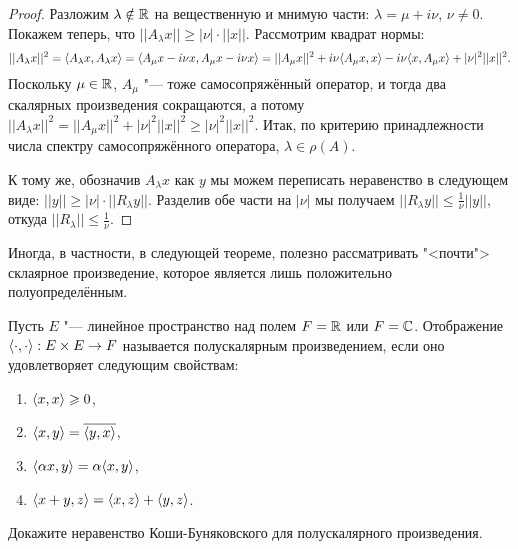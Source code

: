 \documentclass[main]{subfiles}
\begin{document}
\begin{proof}
  Разложим \( \lambda \notin \mathbb{R} \)
  на вещественную и мнимую части:
  \( \lambda = \mu + i \nu \),
  \( \nu \ne 0 \).
  Покажем теперь, что
  \( ||A_\lambda x|| \ge |\nu| \cdot ||x|| \).
  Рассмотрим квадрат нормы:
  \[
    ||A_\lambda x||^2 =
    \langle A_\lambda x, A_\lambda x \rangle =
    \langle A_\mu x - i \nu x, A_\mu x - i \nu x \rangle =
    ||A_\mu x||^2 + i \nu \langle A_\mu x, x \rangle
    - i \nu \langle x, A_\mu x \rangle + |\nu|^2 ||x||^2.
  \]
  Поскольку \( \mu \in \mathbb{R} \),
  \( A_\mu \) "--- тоже самосопряжённый оператор,
  и тогда два скалярных произведения сокращаются,
  а потому \( ||A_\lambda x||^2 = ||A_\mu x||^2 +
  |\nu|^2 ||x||^2 \ge |\nu|^2 ||x||^2 \).
  Итак, по критерию принадлежности числа спектру
  самосопряжённого оператора, \( \lambda \in \rho(A) \).

  К тому же, обозначив \( A_\lambda x \) как \( y \)
  мы можем переписать неравенство в следующем виде:
  \( ||y|| \ge |\nu| \cdot ||R_\lambda y|| \).
  Разделив обе части на \( |\nu| \) мы получаем
  \( ||R_\lambda y|| \le \frac1\nu ||y|| \),
  откуда \( ||R_\lambda|| \le \frac1\nu \).
\end{proof}

Иногда, в частности, в следующей теореме,
полезно рассматривать "<почти"> склаярное произведение,
которое является лишь положительно полуопределённым.

\begin{definition}
  Пусть \( E \) "--- линейное пространство
  над полем \( F = \mathbb{R} \) или \( F = \mathbb{C} \).
  Отображение
  \( \langle \cdot, \cdot \rangle : E \times E \to F \)
  называется полускалярным произведением,
  если оно удовлетворяет следующим свойствам:
  \begin{enumerate}
    \item \( \langle x, x \rangle \geqslant 0 \),
    \item \( \langle x, y \rangle = \overline{\langle y, x \rangle} \),
    \item \( \langle \alpha x, y \rangle = \alpha \langle x, y \rangle \),
    \item \( \langle x + y, z \rangle = \langle x, z \rangle + \langle y, z \rangle \).
  \end{enumerate}
\end{definition}

\begin{exercise}
  Докажите неравенство Коши-Буняковского для полускалярного
  произведения.
\end{exercise}
\end{document}
